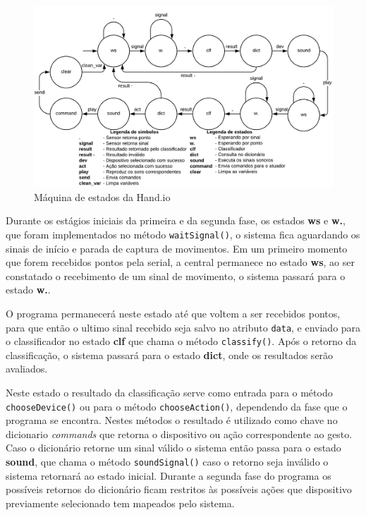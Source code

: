 \begin{figure}[ht]
    \centering
    \includegraphics[width=\textwidth, keepaspectratio]{resources/maquina_estados.pdf}
    \caption{Máquina de estados da Hand.io}
    \label{fig:automato}
\end{figure}

Durante os estágios iniciais da primeira e da segunda fase, os estados \textbf{ws} e \textbf{w.}, que foram implementados no método \texttt{waitSignal()}, o sistema fica aguardando os sinais de início e parada de captura de movimentos. Em um primeiro momento que forem recebidos pontos pela serial, a central permanece no estado \textbf{ws}, ao ser constatado o recebimento de um sinal de movimento, o sistema passará para o estado \textbf{w.}.

O programa permanecerá neste estado até que voltem a ser recebidos pontos, para que então o ultimo sinal recebido seja salvo no atributo \texttt{data}, e enviado para o classificador no estado \textbf{clf} que chama o método \texttt{classify()}. Após o retorno da classificação, o sistema passará para o estado \textbf{dict}, onde os resultados serão avaliados.

Neste estado o resultado da classificação serve como entrada para o método \texttt{chooseDevice()} ou para o método \texttt{chooseAction()}, dependendo da fase que o programa se encontra. Nestes métodos o resultado é utilizado como chave no dicionario \textit{commands} que retorna o dispositivo ou ação correspondente ao gesto. 
Caso o dicionário retorne um sinal válido o sistema então passa para o estado \textbf{sound}, que chama o método \texttt{soundSignal()} caso o retorno seja inválido o sistema retornará ao estado inicial. Durante a segunda fase do programa os possíveis retornos do dicionário ficam restritos às possíveis ações que dispositivo previamente selecionado tem mapeados pelo sistema. 

